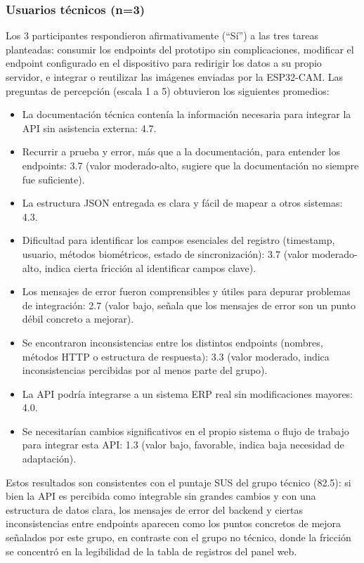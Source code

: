 \documentclass{iccmemoria}
\begin{document}
\subsubsection*{Usuarios técnicos (n=3)}

Los 3 participantes respondieron afirmativamente (``Sí'') a las tres tareas planteadas: consumir los endpoints del prototipo sin complicaciones, modificar el endpoint configurado en el dispositivo para redirigir los datos a su propio servidor, e integrar o reutilizar las imágenes enviadas por la ESP32-CAM. Las preguntas de percepción (escala 1 a 5) obtuvieron los siguientes promedios:

\begin{itemize}
    \item La documentación técnica contenía la información necesaria para integrar la API sin asistencia externa: 4.7.
    \item Recurrir a prueba y error, más que a la documentación, para entender los endpoints: 3.7 (valor moderado-alto, sugiere que la documentación no siempre fue suficiente).
    \item La estructura JSON entregada es clara y fácil de mapear a otros sistemas: 4.3.
    \item Dificultad para identificar los campos esenciales del registro (timestamp, usuario, métodos biométricos, estado de sincronización): 3.7 (valor moderado-alto, indica cierta fricción al identificar campos clave).
    \item Los mensajes de error fueron comprensibles y útiles para depurar problemas de integración: 2.7 (valor bajo, señala que los mensajes de error son un punto débil concreto a mejorar).
    \item Se encontraron inconsistencias entre los distintos endpoints (nombres, métodos HTTP o estructura de respuesta): 3.3 (valor moderado, indica inconsistencias percibidas por al menos parte del grupo).
    \item La API podría integrarse a un sistema ERP real sin modificaciones mayores: 4.0.
    \item Se necesitarían cambios significativos en el propio sistema o flujo de trabajo para integrar esta API: 1.3 (valor bajo, favorable, indica baja necesidad de adaptación).
\end{itemize}

Estos resultados son consistentes con el puntaje SUS del grupo técnico (82.5): si bien la API es percibida como integrable sin grandes cambios y con una estructura de datos clara, los mensajes de error del backend y ciertas inconsistencias entre endpoints aparecen como los puntos concretos de mejora señalados por este grupo, en contraste con el grupo no técnico, donde la fricción se concentró en la legibilidad de la tabla de registros del panel web.



\end{document}
